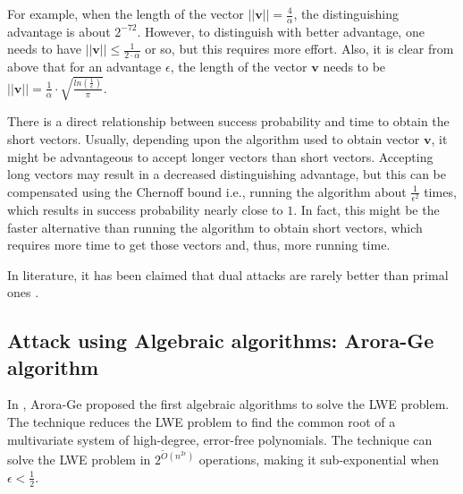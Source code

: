 For example, when the length of the vector $||\textbf{v}||=\frac{4}{\alpha}$, the distinguishing advantage is about $2^{-72}$. However, to distinguish with better advantage, one needs to have $||\textbf{v}|| \leq \frac{1}{2\cdot\alpha}$ or so, but this requires more effort. Also, it is clear from above that for an advantage $\epsilon$, the length of the vector $\textbf{v}$ needs to be  $||\textbf{v}||=\frac{1}{\alpha} \cdot \sqrt{\frac{ln(\frac{1}{\epsilon})}{\pi}}$.

There is a direct relationship between success probability and time to obtain the short vectors. Usually, depending upon the algorithm used to obtain vector $\textbf{v}$, it might be advantageous to accept longer vectors than short vectors. Accepting long vectors may result in a decreased distinguishing advantage, but this can be compensated using the Chernoff bound \cite{chernoff1952measure} i.e., running the algorithm about $\frac{1}{\epsilon^2}$ times, which results in success probability nearly close to $1$. In fact, this might be the faster alternative than running the algorithm to obtain short vectors, which requires more time to get those vectors and, thus, more running time.

In literature, it has been claimed that dual attacks are rarely better than primal ones \cite{albrecht2018estimate}.





\subsection{Attack using Algebraic algorithms: Arora-Ge algorithm}
In \cite{arora2011new}, Arora-Ge proposed the first algebraic algorithms to solve the LWE problem. The technique reduces the LWE problem to find the common root of a multivariate system of high-degree, error-free polynomials. The technique can solve the LWE problem in $2^{\tilde{O}(n^{2\epsilon})}$ operations, making it sub-exponential when $\epsilon<\frac{1}{2}$.

